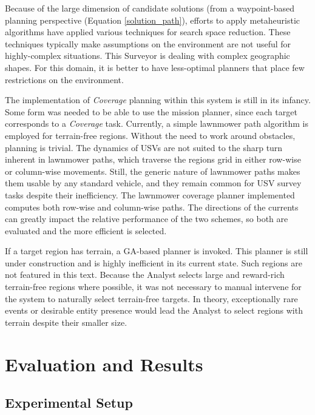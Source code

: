 \documentclass{tamuccthesis}
\begin{document}
Because of the large dimension of candidate solutions (from a waypoint-based planning perspective (Equation \ref{solution_path}), efforts to apply metaheuristic algorithms have applied various techniques for search space reduction. These techniques typically make assumptions on the environment are not useful for highly-complex situations. This Surveyor is dealing with complex geographic shapes. For this domain, it is better to have less-optimal planners that place few restrictions on the environment. 

The implementation of \textit{Coverage} planning within this system is still in its infancy. Some form was needed to be able to use the mission planner, since each target corresponds to a \textit{Coverage} task. Currently, a simple lawnmower path algorithm is employed for terrain-free regions. Without the need to work around obstacles, planning is trivial. The dynamics of USVs are not suited to the sharp turn inherent in lawnmower paths, which traverse the regions grid in either row-wise or column-wise movements. Still, the generic nature of lawnmower paths makes them usable by any standard vehicle, and they remain common for USV survey tasks despite their inefficiency. The lawnmower coverage planner implemented computes both row-wise and column-wise paths. The directions of the currents can greatly impact the relative performance of the two schemes, so both are evaluated and the more efficient is selected. 

If a target region has terrain, a GA-based planner is invoked. This planner is still under construction and is highly inefficient in its current state. Such regions are not featured in this text. Because the Analyst selects large and reward-rich terrain-free regions where possible, it was not necessary to manual intervene for the system to naturally select terrain-free targets. In theory, exceptionally rare events or desirable entity presence would lead the Analyst to select regions with terrain despite their smaller size.


\chapter{Evaluation and Results}

\section{Experimental Setup}
\end{document}
